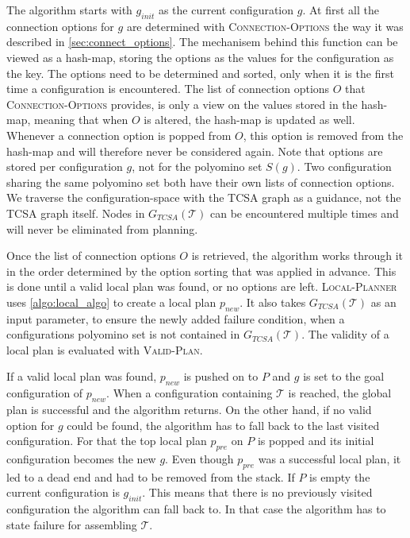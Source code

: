 The algorithm starts with $g_\textit{init}$ as the current configuration $g$.
At first all the connection options for $g$ are determined with {\scshape Connection-Options} the way it was described in \autoref{sec:connect_options}.
The mechanisem behind this function can be viewed as a hash-map, storing the options as the values for the configuration as the key.
The options need to be determined and sorted, only when it is the first time a configuration is encountered.
The list of connection options $O$ that {\scshape Connection-Options} provides, is only a view on the values stored in the hash-map, meaning that when $O$ is altered, the hash-map is updated as well.
Whenever a connection option is popped from $O$, this option is removed from the hash-map and will therefore never be considered again.
Note that options are stored per configuration $g$, not for the polyomino set $S(g)$.
Two configuration sharing the same polyomino set both have their own lists of connection options.
We traverse the configuration-space with the TCSA graph as a guidance, not the TCSA graph itself.
Nodes in $G_{\textit{TCSA}}(\mathcal{T})$ can be encountered multiple times and will never be eliminated from planning.

Once the list of connection options $O$ is retrieved, the algorithm works through it in the order determined by the option sorting that was applied in advance.
This is done until a valid local plan was found, or no options are left.
{\scshape Local-Planner} uses \autoref{algo:local_algo} to create a local plan $p_\textit{new}$.
It also takes $G_{\textit{TCSA}}(\mathcal{T})$ as an input parameter, to ensure the newly added failure condition, when a configurations polyomino set is not contained in $G_{\textit{TCSA}}(\mathcal{T})$.
The validity of a local plan is evaluated with {\scshape Valid-Plan}.

If a valid local plan was found, $p_\textit{new}$ is pushed on to $P$ and $g$ is set to the goal configuration of $p_\textit{new}$.
When a configuration containing $\mathcal{T}$ is reached, the global plan is successful and the algorithm returns.
On the other hand, if no valid option for $g$ could be found, the algorithm has to fall back to the last visited configuration.
For that the top local plan $p_\textit{pre}$ on $P$ is popped and its initial configuration becomes the new $g$.
Even though $p_\textit{pre}$ was a successful local plan, it led to a dead end and had to be removed from the stack.
If $P$ is empty the current configuration is $g_\textit{init}$.
This means that there is no previously visited configuration the algorithm can fall back to.
In that case the algorithm has to state failure for assembling $\mathcal{T}$.

